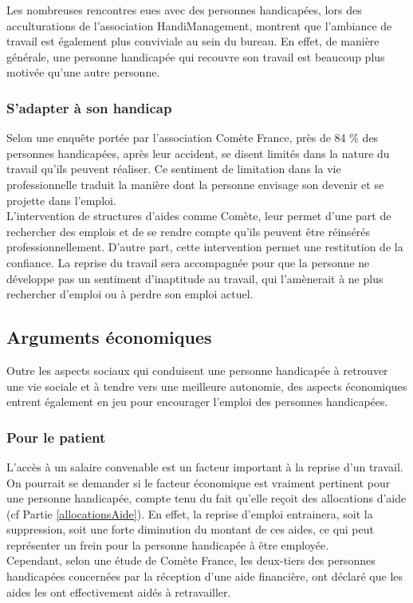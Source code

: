 Les nombreuses rencontres eues avec des personnes handicapées, lors des acculturations de l'association HandiManagement, montrent que l'ambiance de travail est également plus conviviale au sein du bureau. En effet, de manière générale, une personne handicapée qui recouvre son travail est beaucoup plus motivée qu'une autre personne.

\subsubsection{S'adapter à son handicap}
Selon une enquête portée par l'association Comète France, près de 84 \% des personnes handicapées, après leur accident, se disent limités dans la nature du travail qu'ils peuvent réaliser. Ce sentiment de limitation dans la vie professionnelle traduit la manière dont la personne envisage son devenir et se projette dans l'emploi.\\

L'intervention de structures d'aides comme Comète, leur permet d'une part de rechercher des emplois et de se rendre compte qu'ils peuvent être réinsérés professionnellement. D'autre part, cette intervention permet une restitution de la confiance. 
La reprise du travail sera accompagnée pour que la personne ne développe pas un sentiment d'inaptitude au travail, qui l'amènerait à ne plus rechercher d'emploi ou à perdre son emploi actuel.


\subsection{Arguments économiques}

Outre les aspects sociaux qui conduisent une personne handicapée à retrouver une vie sociale et à tendre vers une meilleure autonomie, des aspects économiques entrent également en jeu pour encourager l'emploi des personnes handicapées.

\subsubsection{Pour le patient}
L'accès à un salaire convenable est un facteur important à la reprise d'un travail.\\

On pourrait se demander si le facteur économique est vraiment pertinent pour une personne handicapée, compte tenu du fait qu'elle reçoit des allocations d'aide (cf Partie \ref{allocationsAide}). En effet, la reprise d'emploi entrainera, soit la suppression, soit une forte diminution du montant de ces aides, ce qui peut représenter un frein pour la personne handicapée à être employée.\\
Cependant, selon une étude de Comète France, les deux-tiers des personnes handicapées concernées par la réception d'une aide financière, ont déclaré que les aides les ont effectivement aidés à retravailler.\\

